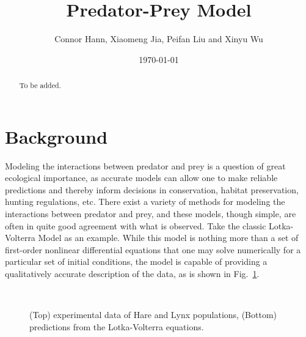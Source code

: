 \documentclass[aps,prl,preprint,superscriptaddress]{revtex4}
\begin{document}
	
	
	\title{Predator-Prey Model}%
	
	\author{Connor Hann, Xiaomeng Jia, Peifan Liu and Xinyu Wu}
	
	
	\date{\today}
	
	\begin{abstract}
		To be added.
	\end{abstract}
	
	\maketitle
	
	
	
\section{Background} 
Modeling the interactions between predator and prey is a question of great ecological importance, as accurate models can allow one to make reliable predictions and thereby inform decisions in conservation, habitat preservation, hunting regulations, etc. There exist a variety of methods for modeling the interactions between predator and prey, and these models, though simple, are often in quite good agreement with what is observed. Take the classic Lotka-Volterra Model as an example. While this model is nothing more than a set of first-order nonlinear differential equations that one may solve numerically for a particular set of initial conditions, the model is capable of providing a qualitatively accurate description of the data, as is shown in Fig.~\ref{LV}. 

\begin{figure}[H]
	\centering
	\\
	\caption{(Top) experimental data of Hare and Lynx populations, (Bottom) predictions from the Lotka-Volterra equations. }
	\label{LV} 
\end{figure}
\end{document}
